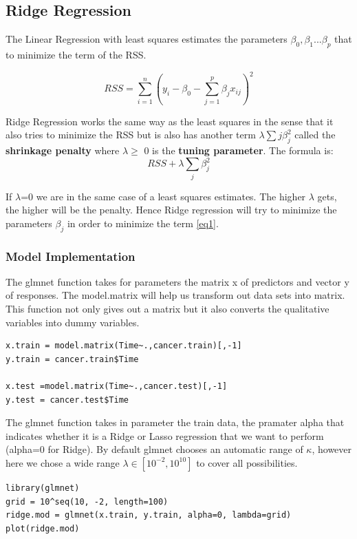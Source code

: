 \documentclass[]{report}
\begin{document}
\subsection{Ridge Regression}
The Linear Regression with least squares estimates the parameters $\beta_{0},\beta_{1}...\beta_{p}$ that to minimize the term of the RSS.
\begin{center}
	$$ RSS = \sum_{i=1}^{n}(y_{i} - \beta_{0} - \sum_{j=1}^{p}\beta_{j}x_{ij})^{2} $$
\end{center}

Ridge Regression works the same way as the least squares in the sense that it also tries to minimize the RSS but is also has another term $\lambda \sum{j}\beta_{j}^{2}$ called the \textbf{shrinkage penalty} where $\lambda\geq$ 0 is the \textbf{ tuning parameter}. The formula is:
		\begin{equation} \label{eq1}
		  RSS + \lambda \sum_{j}\beta_{j}^{2}
		\end{equation}			

If $\lambda$=0 we are in the same case of a least squares estimates. The higher $\lambda$ gets, the higher will be the penalty. Hence Ridge regression will try to minimize the parameters $\beta_{j}$ in order to minimize the term \ref{eq1}.\\
\subsubsection{Model Implementation}
The glmnet function takes for parameters the matrix x of predictors and vector y of responses. The model.matrix will help us transform out data sets into matrix. This function not only gives out a matrix but it also converts the qualitative variables into dummy variables.
\begin{lstlisting}
x.train = model.matrix(Time~.,cancer.train)[,-1] 
y.train = cancer.train$Time

x.test =model.matrix(Time~.,cancer.test)[,-1]
y.test = cancer.test$Time
\end{lstlisting}
The glmnet function takes in parameter the train data, the pramater alpha that indicates whether it is a Ridge or Lasso regression that we want to perform (alpha=0 for Ridge). By default glmnet chooses an automatic range of $\kappa$, however here we chose a wide range $\lambda\in[10^{−2},10^{10}]$ to cover all possibilities.

\begin{lstlisting}
library(glmnet)
grid = 10^seq(10, -2, length=100)
ridge.mod = glmnet(x.train, y.train, alpha=0, lambda=grid)
plot(ridge.mod)
\end{lstlisting}
\end{document}
